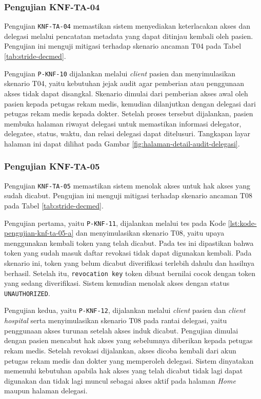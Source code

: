 \subsubsection{Pengujian KNF-TA-04}
\label{subsubsec:pengujian-knf-ta-04}

Pengujian \texttt{KNF-TA-04} memastikan sistem menyediakan keterlacakan akses dan delegasi melalui pencatatan metadata yang dapat ditinjau kembali oleh pasien. Pengujian ini menguji mitigasi terhadap skenario ancaman T04 pada Tabel \ref{tab:stride-decmed}.

Pengujian \texttt{P-KNF-10} dijalankan melalui \textit{client} pasien dan menyimulasikan skenario T04, yaitu kebutuhan jejak audit agar pemberian atau penggunaan akses tidak dapat disangkal. Skenario dimulai dari pemberian akses awal oleh pasien kepada petugas rekam medis, kemudian dilanjutkan dengan delegasi dari petugas rekam medis kepada dokter. Setelah proses tersebut dijalankan, pasien membuka halaman riwayat delegasi untuk memastikan informasi delegator, delegatee, status, waktu, dan relasi delegasi dapat ditelusuri. Tangkapan layar halaman ini dapat dilihat pada Gambar \ref{fig:halaman-detail-audit-delegasi}.

\subsubsection{Pengujian KNF-TA-05}
\label{subsubsec:pengujian-knf-ta-05}

Pengujian \texttt{KNF-TA-05} memastikan sistem menolak akses untuk hak akses yang sudah dicabut. Pengujian ini menguji mitigasi terhadap skenario ancaman T08 pada Tabel \ref{tab:stride-decmed}.

Pengujian pertama, yaitu \texttt{P-KNF-11}, dijalankan melalui tes pada Kode \ref{lst:kode-pengujian-knf-ta-05-a} dan menyimulasikan skenario T08, yaitu upaya menggunakan kembali token yang telah dicabut. Pada tes ini dipastikan bahwa token yang sudah masuk daftar revokasi tidak dapat digunakan kembali. Pada skenario ini, token yang belum dicabut diverifikasi terlebih dahulu dan hasilnya berhasil. Setelah itu, \texttt{revocation key} token dibuat bernilai cocok dengan token yang sedang diverifikasi. Sistem kemudian menolak akses dengan status \texttt{UNAUTHORIZED}.

Pengujian kedua, yaitu \texttt{P-KNF-12}, dijalankan melalui \textit{client} pasien dan \textit{client hospital} serta menyimulasikan skenario T08 pada rantai delegasi, yaitu penggunaan akses turunan setelah akses induk dicabut. Pengujian dimulai dengan pasien mencabut hak akses yang sebelumnya diberikan kepada petugas rekam medis. Setelah revokasi dijalankan, akses dicoba kembali dari akun petugas rekam medis dan dokter yang memperoleh delegasi. Sistem dinyatakan memenuhi kebutuhan apabila hak akses yang telah dicabut tidak lagi dapat digunakan dan tidak lagi muncul sebagai akses aktif pada halaman \textit{Home} maupun halaman delegasi.

